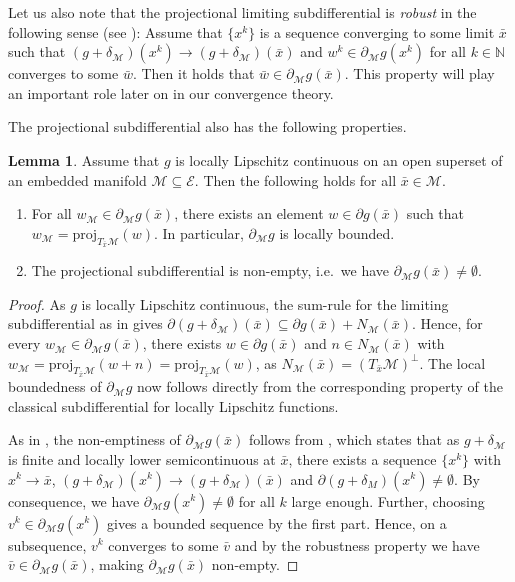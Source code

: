 \documentclass[a4paper, 12pt]{article}
\numberwithin{equation}{section}
\theoremstyle{bolddef}
\theoremstyle{definition}
\theoremstyle{boldplain}
\newtheorem{lemma}[definition]{Lemma}
\newcommand{\xk}{x^k}
\newcommand{\wk}{w^k}
\newcommand{\N}{\mathbb{N}}
\newcommand{\X}{\mathcal{E}}
\newcommand{\proj}{\mathrm{proj}}
\begin{document}
Let us also note that the projectional limiting subdifferential is \emph{robust} in the following sense (see \cite[Corollary 3.1]{Khanh2026}): Assume that $\{\xk\}$ is a sequence converging to some limit $\bar x$ such that $(g+\delta_\mathcal{M})(\xk) \to (g+\delta_\mathcal{M})(\bar x)$ and $\wk \in \partial_\mathcal{M} g(\xk)$ for all $k \in \N$ converges to some $\bar w$. Then it holds that $\bar w \in \partial_\mathcal{M} g(\bar x)$. This property will play an important role later on in our convergence theory. 

The projectional subdifferential also has the following properties. 
\begin{lemma}\label{lem:projsubdiff}
	Assume that $g$ is locally Lipschitz continuous on an open superset of an embedded manifold $\mathcal{M} \subseteq \X$. Then the following holds for all $\bar x \in \mathcal{M}$.
	\begin{enumerate}
		\item For all $w_\mathcal{M} \in \partial_\mathcal{M} g(\bar x)$, there exists an element $w \in \partial g(\bar x)$ such that $w_\mathcal{M} = \proj_{T_{\bar x} \mathcal{M}} (w)$. In particular, $\partial_\mathcal{M} g$ is locally bounded.
		\item The projectional subdifferential is non-empty, i.e.\ we have $\partial_\mathcal{M} g(\bar x) \neq \emptyset$.
	\end{enumerate}
\end{lemma}
\begin{proof}
As $g$ is locally Lipschitz continuous, the sum-rule for the limiting subdifferential as in \cite[Corallary 2.20]{Mordukhovich2018} gives $\partial(g + \delta_\mathcal{M})(\bar x) \subseteq \partial g(\bar x) + N_\mathcal{M}(\bar x)$. Hence, for every $w_\mathcal{M} \in \partial_\mathcal{M} g(\bar x)$, there exists $w \in \partial g(\bar x)$ and $n \in N_\mathcal{M}(\bar x)$ with $w_\mathcal{M} = \proj_{T_{\bar x} \mathcal{M}} (w+n) = \proj_{T_{\bar x} \mathcal{M}}(w)$, as $N_\mathcal{M}(\bar x) = (T_{\bar x} \mathcal{M})^\perp$. The local boundedness of $\partial_\mathcal{M} g$ now follows directly from the corresponding property of the classical subdifferential for locally Lipschitz functions.

As in \cite{Meng2021}, the non-emptiness of $\partial_\mathcal{M} g(\bar x)$ follows from \cite[Corollary 8.10]{RockafellarWets2009}, which states that as $g+\delta_\mathcal{M}$ is finite and locally lower semicontinuous at $\bar x$, there exists a sequence $\{\xk\}$ with $\xk \to \bar x$, $(g + \delta_\mathcal{M})(\xk) \to (g + \delta_\mathcal{M})(\bar x)$ and $\partial (g+\delta_M)(\xk) \neq \emptyset$. By consequence, we have $\partial_\mathcal{M}g (\xk) \neq \emptyset$ for all $k$ large enough. Further, choosing $v^k \in \partial_\mathcal{M} g(\xk)$ gives a bounded sequence by the first part. Hence, on a subsequence, $v^k$ converges to some $\bar v$ and by the robustness property we have $\bar v \in \partial_\mathcal{M}g(\bar x)$, making $\partial_\mathcal{M}g(\bar x)$ non-empty.
\end{proof}
\end{document}
